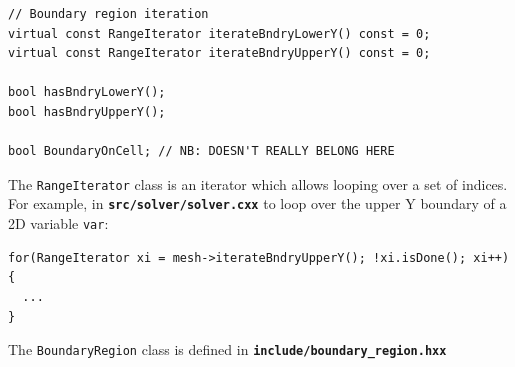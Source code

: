 \documentclass[12pt]{article}
\newcommand{\code}[1]{\texttt{#1}}
\newcommand{\file}[1]{\texttt{\bf #1}}
\begin{document}
%
\begin{lstlisting}
// Boundary region iteration
virtual const RangeIterator iterateBndryLowerY() const = 0;
virtual const RangeIterator iterateBndryUpperY() const = 0;

bool hasBndryLowerY();
bool hasBndryUpperY();

bool BoundaryOnCell; // NB: DOESN'T REALLY BELONG HERE
\end{lstlisting}
%
The \code{RangeIterator} class is an iterator
%
%
which allows looping over a set of indices.
For example, in \file{src/solver/solver.cxx} to loop over the upper Y boundary
of a 2D variable \code{var}:
%
\begin{lstlisting}
for(RangeIterator xi = mesh->iterateBndryUpperY(); !xi.isDone(); xi++) {
  ...
}
\end{lstlisting}
%
The
%
\lstinline!BoundaryRegion!
%
 class is defined in \file{include/boundary\_region.hxx}
\end{document}
